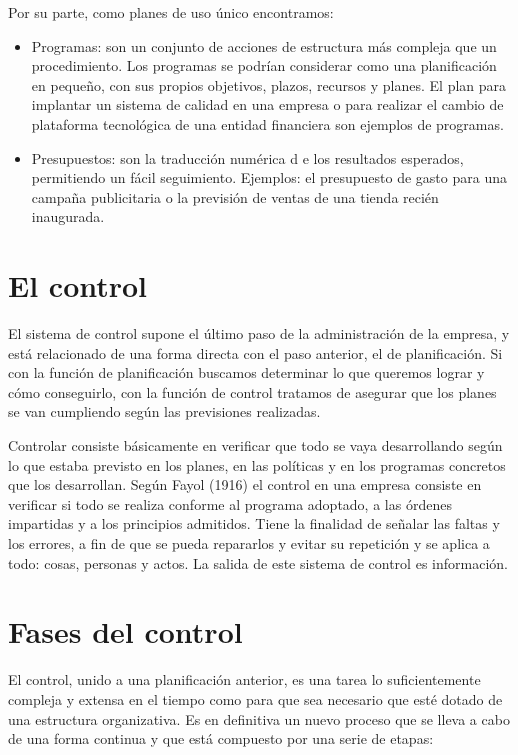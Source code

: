 \documentclass[
]{krantz}
\providecommand{\tightlist}{%
  \setlength{\itemsep}{0pt}\setlength{\parskip}{0pt}}
\begin{document}
Por su parte, como planes de uso único encontramos:

\begin{itemize}
\tightlist
\item
  Programas: son un conjunto de acciones de estructura más compleja que un procedimiento. Los programas se podrían considerar como una planificación en pequeño, con sus propios objetivos, plazos, recursos y planes. El plan para implantar un sistema de calidad en una empresa o para realizar el cambio de plataforma tecnológica de una entidad financiera son ejemplos de programas.
\item
  Presupuestos: son la traducción numérica d e los resultados esperados, permitiendo un fácil seguimiento. Ejemplos: el presupuesto de gasto para una campaña publicitaria o la previsión de ventas de una tienda recién inaugurada.
\end{itemize}

\hypertarget{el-control}{%
\section{El control}\label{el-control}}

El sistema de control supone el último paso de la administración de la empresa, y está relacionado de una forma directa con el paso anterior, el de planificación. Si con la función de planificación buscamos determinar lo que queremos lograr y cómo conseguirlo, con la función de control tratamos de asegurar que los planes se van cumpliendo según las previsiones realizadas.

Controlar consiste básicamente en verificar que todo se vaya desarrollando según lo que estaba previsto en los planes, en las políticas y en los programas concretos que los desarrollan. Según Fayol (1916) el control en una empresa consiste en verificar si todo se realiza conforme al programa adoptado, a las órdenes impartidas y a los principios admitidos. Tiene la finalidad de señalar las faltas y los errores, a fin de que se pueda repararlos y evitar su repetición y se aplica a todo: cosas, personas y actos. La salida de este sistema de control es información.

\hypertarget{fases-del-control}{%
\section{Fases del control}\label{fases-del-control}}

El control, unido a una planificación anterior, es una tarea lo suficientemente compleja y extensa en el tiempo como para que sea necesario que esté dotado de una estructura organizativa. Es en definitiva un nuevo proceso que se lleva a cabo de una forma continua y que está compuesto por una serie de etapas:
\end{document}
